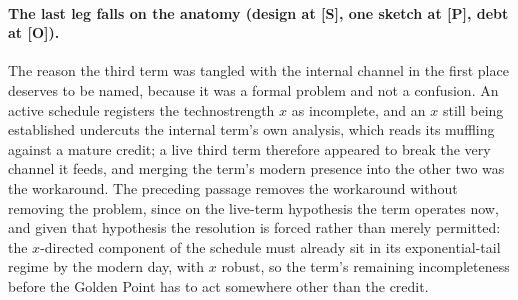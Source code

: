 \paragraph{The last leg falls on the anatomy (design at \textbf{[S]},
one sketch at \textbf{[P]}, debt at \textbf{[O]}).}\label{sch:rem:anatomyleg}
The reason the third term was tangled with the internal channel in
the first place deserves to be named, because it was a formal
problem and not a confusion. An active schedule registers the
technostrength $x$ as incomplete, and an $x$ still being established
undercuts the internal term's own analysis, which reads its muffling
against a mature credit; a live third term therefore appeared to
break the very channel it feeds, and merging the term's modern
presence into the other two was the workaround. The preceding
passage removes the workaround without removing the problem, since
on the live-term hypothesis the term operates now, and given that
hypothesis the resolution is forced rather than merely permitted:
the $x$-directed component of the schedule must already sit in its
exponential-tail regime by the modern day, with $x$ robust, so the
term's remaining incompleteness before the Golden Point has to act
somewhere other than the credit.

